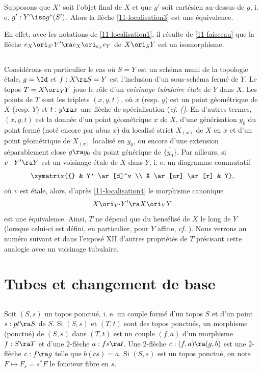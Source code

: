 \documentclass[10pt]{../fichiers-configuration-latex/smfart}
\begin{document}
\begin{proposition}\label{11-localisation4} Supposons que $X'$ soit l'objet final de $X$ et que $g'$
soit cartésien au-dessus de $g$, i. e. $g' : Y' \iso g^*(S')$. Alors la flèche
\ref{11-localisation3} est une équivalence. 
\end{proposition}

En effet, avec les notations de
\ref{11-localisation1}, il résulte de \ref{11-faisceau} que la flèche $e_X \ori_{S'} Y' \ra e_X
\ori_{e_S} e_Y$ de $X \ori_{S} Y$ est un isomorphisme.

\subsection{}\label{11-tubes} Considérons en
particulier le cas où $S = Y$ est un schéma muni de la topologie étale, $g = \Id$ et $f : X \ra S =
Y$ est l'inclusion d'un sous-schéma fermé de $Y$. Le topos $T = X \ori_Y Y$ joue le rôle d'un
\textit{voisinage tubulaire étale} de $Y$ dans $X$. Les points de $T$ sont les triplets $(x,y,t)$,
où $x$ (resp. $y$) est un point géométrique de $X$ (resp. $Y$) et $t : y \ra x$ une flèche de
spécialisation (\textit{cf.  ()}. En d'autres termes, $(x,y,t)$ est la donnée d'un
point géométrique $x$ de $X$, d'une générisation $y_0$ du point fermé (noté encore par abus $x$) du
localisé strict  $X_{(x)}$ de $X$ en $x$ et d'un point géométrique de  $X_{(x)}$ localisé en $y_0$,
ou encore d'une extension séparablement close $y \ra y_0$ du point générique de
$\overline{\{y_0\}}$. Par ailleurs, si $v : Y' \ra Y$ est un voisinage étale de $X$ dans $Y$, i. e.
un diagramme commutatif $$ \xymatrix{{} & Y' \ar[d]^v \\ X \ar[ur] \ar[r] & Y}, $$ où $v$ est étale,
alors, d'après \ref{11-localisation4} le morphisme canonique $$ X \ori_{Y'} Y' \ra X \ori_Y Y $$ est
une équivalence. Ainsi, $T$ ne dépend que du hensélisé de $X$ le long de $Y$ (lorsque celui-ci est
défini, en particulier, pour $Y$ affine, \textit{cf.} \cite{Anneaux@Raynaud}). Nous verrons au
numéro suivant et dans l'exposé XII d'autres propriétés de $T$ précisant cette analogie avec un
voisinage tubulaire.  \section{Tubes et changement de base}

\subsection{}\label{11-topos locaux}
Soit $(S,s)$ un topos ponctué, i. e. un couple formé d'un topos $S$ et d'un point $s : pt \ra S$ de
$S$. Si $(S,s)$ et $(T,t)$ sont des topos ponctués, un morphisme (ponctué) de $(S,s)$ dans $(T,t)$
est un couple $(f,a)$ d'un morphisme $f : S \ra T$ et d'une 2-flèche $a : fs \ra t$. Une 2-flèche $c
: (f,a) \ra (g,b)$ est une 2-flèche $c : f \ra g$ telle que $b(cs) = a$. Si $(S,s)$ est un topos
ponctué, on note $F \mapsto F_s = s^*F$ le foncteur fibre en $s$.
\end{document}
